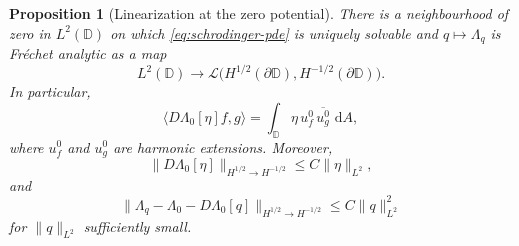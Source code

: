 \IfFileExists{iopjournal.cls}{\documentclass{iopjournal}}{\documentclass{iopjournal-draft}}
\newtheorem{proposition}[theorem]{Proposition}
\theoremstyle{definition}
\theoremstyle{remark}
\newcommand{\D}{\mathbb D}
\newcommand{\dd}{\,\mathrm d}
\newcommand{\norm}[1]{\lVert #1\rVert}
\newcommand{\ip}[2]{\langle #1,#2\rangle}
\numberwithin{equation}{section}
\begin{document}
\begin{proposition}[Linearization at the zero potential]
\label{prop:linearization}
There is a neighbourhood of zero in $L^2(\D)$ on which \eqref{eq:schrodinger-pde} is uniquely solvable and $q\mapsto\Lambda_q$ is Fr\'echet analytic as a map
\[
 L^2(\D)\longrightarrow
 \mathcal L\bigl(H^{1/2}(\partial\D),H^{-1/2}(\partial\D)\bigr).
\]
In particular,
\begin{equation}
 \ip{D\Lambda_0[\eta]f}{g}
 =\int_{\D}\eta\,u_f^0\,\overline{u_g^0}\,\dd A,
 \label{eq:linearized-DtN}
\end{equation}
where $u_f^0$ and $u_g^0$ are harmonic extensions.  Moreover,
\begin{equation}
 \norm{D\Lambda_0[\eta]}_{H^{1/2}\to H^{-1/2}}
 \leq C\norm{\eta}_{L^2},
 \label{eq:derivative-bound}
\end{equation}
and
\begin{equation}
 \norm{\Lambda_q-\Lambda_0-D\Lambda_0[q]}_{H^{1/2}\to H^{-1/2}}
 \leq C\norm{q}_{L^2}^2
 \label{eq:quadratic-remainder}
\end{equation}
for $\norm q_{L^2}$ sufficiently small.
\end{proposition}
\end{document}
